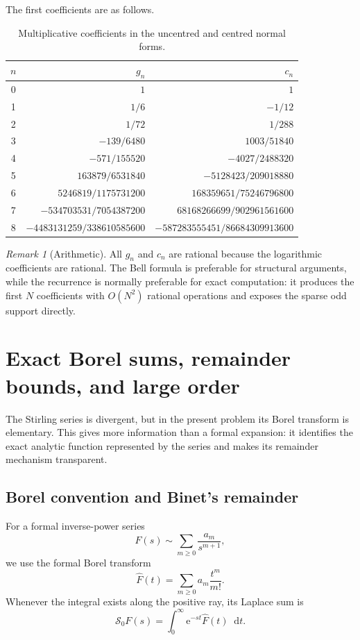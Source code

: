 \documentclass[11pt,a4paper,oneside]{article}
\theoremstyle{plain}
\theoremstyle{definition}
\theoremstyle{remark}
\newtheorem{remark}[theorem]{Remark}
\newcommand{\e}{\mathrm e}
\newcommand{\dd}{\mathop{}\!\mathrm d}
\begin{document}
The first coefficients are as follows.
\begin{table}[htbp]
\centering
\caption{Multiplicative coefficients in the uncentred and centred normal forms.}
\label{tab:direct-coefficients}
\small
\begin{tabular}{c@{\qquad}r@{\qquad}r}
\toprule
$n$ & $g_n$ & $c_n$\\
\midrule
0 & $1$ & $1$\\
1 & $1/6$ & $-1/12$\\
2 & $1/72$ & $1/288$\\
3 & $-139/6480$ & $1003/51840$\\
4 & $-571/155520$ & $-4027/2488320$\\
5 & $163879/6531840$ & $-5128423/209018880$\\
6 & $5246819/1175731200$ & $168359651/75246796800$\\
7 & $-534703531/7054387200$ & $68168266699/902961561600$\\
8 & $-4483131259/338610585600$ & $-587283555451/86684309913600$\\
\bottomrule
\end{tabular}
\end{table}

\begin{remark}[Arithmetic]
All $g_n$ and $c_n$ are rational because the logarithmic coefficients are
rational.  The Bell formula is preferable for structural arguments, while the
recurrence is normally preferable for exact computation: it produces the first
$N$ coefficients with $O(N^2)$ rational operations and exposes the sparse odd
support directly.
\end{remark}

\section{Exact Borel sums, remainder bounds, and large order}
\label{sec:borel}

The Stirling series is divergent, but in the present problem its Borel
transform is elementary.  This gives more information than a formal expansion:
it identifies the exact analytic function represented by the series and makes
its remainder mechanism transparent.

\subsection{Borel convention and Binet's remainder}

For a formal inverse-power series
\begin{equation}
 F(s)\sim\sum_{m\ge0}\frac{a_m}{s^{m+1}},
 \label{eq:borel-convention-series}
\end{equation}
we use the formal Borel transform
\begin{equation}
 \widehat F(t)=\sum_{m\ge0}a_m\frac{t^m}{m!}.
 \label{eq:borel-convention-transform}
\end{equation}
Whenever the integral exists along the positive ray, its Laplace sum is
\begin{equation}
 \mathscr S_0F(s)=\int_0^\infty\e^{-st}\widehat F(t)\dd t.
 \label{eq:borel-laplace}
\end{equation}
\end{document}
